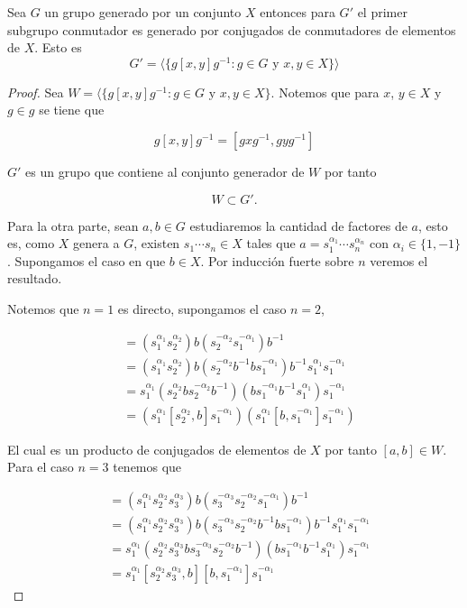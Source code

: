 \begin{pr} \label{pr:Derivados_y_generadores}

Sea $G$ un grupo  generado por un conjunto $X$ entonces para $G'$ el primer subgrupo conmutador es generado por conjugados de conmutadores de elementos de $X$. Esto es
$$G'=\langle\{ g[x,y]g^{-1}: g \in G \text{ y } x,y \in X \} \rangle$$
\end{pr}

\begin{proof}

Sea $W=\langle\{ g[x,y]g^{-1}: g \in G \text{ y } x,y \in X \}$. 
Notemos que para $x$, $y \in X$ y $g \in g$ se tiene que 

$$g[x,y]g^{-1}=[gxg^{-1},gyg^{-1}]$$

$G'$ es un grupo que contiene al conjunto generador de $W$ por tanto

$$W \subset  G'.$$

Para la otra parte, sean $a, b \in G$ estudiaremos la cantidad de factores de  $a$, esto es, como $X$ genera a $G$, existen $s_1 \cdots s_n \in X$ tales que $a= s_1^{\alpha_1} \cdots s_n^{\alpha_n}$ con $\alpha_i \in \{1, -1\}$. Supongamos el caso en que $b \in X$. Por inducción fuerte sobre $n$ veremos el resultado. 

Notemos que $n=1$ es directo, supongamos el caso $n=2$,

\begin{align*}
[s_1^{\alpha_1}s_2^{\alpha_2},b] & =(s_1^{\alpha_1}s_2^{\alpha_2})b(s_2^{-\alpha_2}s_1^{-\alpha_1})b^{-1}\\
& = (s_1^{\alpha_1}s_2^{\alpha_2})b(s_2^{-\alpha_2}b^{-1}bs_1^{-\alpha_1})b^{-1}s_1^{\alpha_1}s_1^{-\alpha_1} \\
& = s_1^{\alpha_1}(s_2^{\alpha_2}bs_2^{-\alpha_2}b^{-1})(bs_1^{-\alpha_1}b^{-1}s_1^{\alpha_1})s_1^{-\alpha_1} \\
& = (s_1^{\alpha_1}[s_2^{\alpha_2},b]s_1^{-\alpha_1})(s_1^{\alpha_1}[b,s_1^{-\alpha_1}]s_1^{-\alpha_1}) 
\end{align*}



El cual es un producto de conjugados de elementos de $X$ por 
tanto $[a,b] \in W.$ Para el caso $n=3$ tenemos que 

\begin{align*}
[s_1^{\alpha_1}s_2^{\alpha_2}s_3^{\alpha_3},b] & =(s_1^{\alpha_1}s_2^{\alpha_2}s_3^{\alpha_3})b(s_3^{-\alpha_3}s_2^{-\alpha_2}s_1^{-\alpha_1})b^{-1} \\
& = (s_1^{\alpha_1}s_2^{\alpha_2}s_3^{\alpha_3})b(s_3^{-\alpha_3}s_2^{-\alpha_2}b^{-1}bs_1^{-\alpha_1})b^{-1}s_1^{\alpha_1}s_1^{-\alpha_1} \\
& = s_1^{\alpha_1}(s_2^{\alpha_2}s_3^{\alpha_3}bs_3^{-\alpha_3}s_2^{-\alpha_2}b^{-1})(bs_1^{-\alpha_1}b^{-1}s_1^{\alpha_1})s_1^{-\alpha_1} \\ 
& = s_1^{\alpha_1}[s_2^{\alpha_2}s_3^{\alpha_3},b][b,s_1^{-\alpha_1}]s_1^{-\alpha_1}
\end{align*}


\end{proof}
